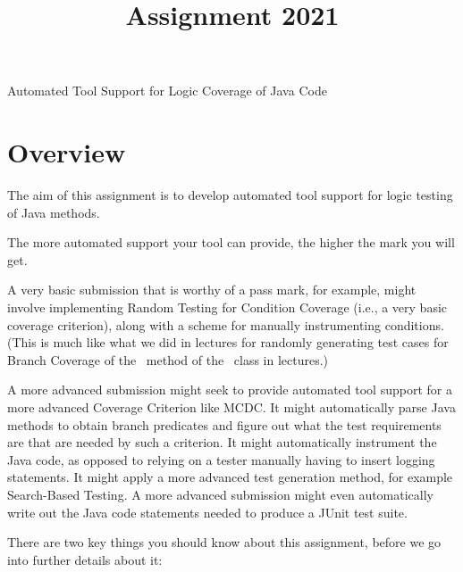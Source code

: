 



\title{Assignment 2021}{Automated Tool Support for Logic Coverage of Java Code}

\section{Overview}

The aim of this assignment is to develop automated tool support for logic
testing of Java methods.

The more automated support your tool can provide, the higher the mark you will
get. 

A very basic submission that is worthy of a pass mark, for example, might
involve implementing Random Testing for Condition Coverage (i.e., a very basic
coverage criterion), along with a scheme for manually instrumenting conditions.
(This is much like what we did in lectures for randomly generating test cases
for Branch Coverage of the \classifymethod~method of the \triangleclass~class in
lectures.)

A more advanced submission might seek to provide automated tool support for a
more advanced Coverage Criterion like MCDC. It might automatically parse Java
methods to obtain branch predicates and figure out what the test requirements
are that are needed by such a criterion. It might automatically instrument the
Java code, as opposed to relying on a tester manually having to insert logging
statements. It might apply a more advanced test generation method, for example
Search-Based Testing. A more advanced submission might even automatically write
out the Java code statements needed to produce a JUnit test suite. 

There are two key things you should know about this assignment, before we go
into further details about it:

